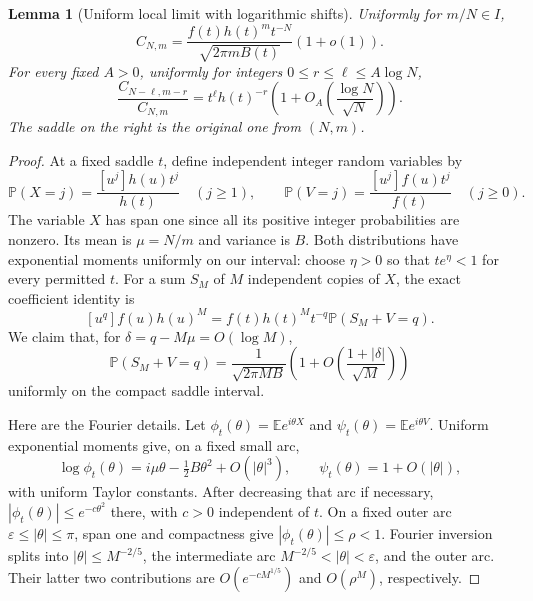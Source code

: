 \documentclass[11pt,letterpaper]{article}
\newtheorem{lemma}[theorem]{Lemma}
\theoremstyle{remark}\newtheorem{remark}[theorem]{Remark}
\newcommand{\Prob}{\mathbb P}
\newcommand{\E}{\mathbb E}
\begin{document}
\begin{lemma}[Uniform local limit with logarithmic shifts]\label{wdn:dia:lem:LLT}
Uniformly for $m/N\in I$,
\begin{equation}\label{wdn:dia:eq:saddle}
 C_{N,m}=\frac{f(t)h(t)^mt^{-N}}{\sqrt{2\pi mB(t)}}(1+o(1)).
\end{equation}
For every fixed $A>0$, uniformly for integers $0\le r\le\ell\le A\log N$,
\begin{equation}\label{wdn:dia:eq:shift}
 \frac{C_{N-\ell,m-r}}{C_{N,m}}
 =t^\ell h(t)^{-r}\left(1+O_A\left(\frac{\log N}{\sqrt N}\right)\right).
\end{equation}
The saddle on the right is the original one from $(N,m)$.
\end{lemma}
\begin{proof}
At a fixed saddle $t$, define independent integer random variables by
\[
 \Prob(X=j)=\frac{[u^j]h(u)t^j}{h(t)}\quad(j\ge1),\qquad
 \Prob(V=j)=\frac{[u^j]f(u)t^j}{f(t)}\quad(j\ge0).
\]
The variable $X$ has span one since all its positive integer probabilities
are nonzero. Its mean is $\mu=N/m$ and variance is $B$. Both distributions
have exponential moments uniformly on our interval: choose $\eta>0$ so that
$t e^\eta<1$ for every permitted $t$. For a sum $S_M$ of $M$ independent
copies of $X$, the exact coefficient identity is
\begin{equation}\label{wdn:dia:eq:probcoef}
 [u^q]f(u)h(u)^M=f(t)h(t)^Mt^{-q}\Prob(S_M+V=q).
\end{equation}
We claim that, for $\delta=q-M\mu=O(\log M)$,
\begin{equation}\label{wdn:dia:eq:localprob}
 \Prob(S_M+V=q)=\frac1{\sqrt{2\pi MB}}
 \left(1+O\left(\frac{1+|\delta|}{\sqrt M}\right)\right)
\end{equation}
uniformly on the compact saddle interval.

Here are the Fourier details. Let $\phi_t(\theta)=\E e^{i\theta X}$ and
$\psi_t(\theta)=\E e^{i\theta V}$. Uniform exponential moments give, on a
fixed small arc,
\[
 \log\phi_t(\theta)=i\mu\theta-\tfrac12B\theta^2+O(|\theta|^3),
 \qquad \psi_t(\theta)=1+O(|\theta|),
\]
with uniform Taylor constants. After decreasing that arc if necessary,
$|\phi_t(\theta)|\le e^{-c\theta^2}$ there, with $c>0$ independent of $t$.
On a fixed outer arc $\varepsilon\le|\theta|\le\pi$, span one and compactness
give $|\phi_t(\theta)|\le\rho<1$. Fourier inversion splits into
$|\theta|\le M^{-2/5}$, the intermediate arc
$M^{-2/5}<|\theta|<\varepsilon$, and the outer arc. Their latter two
contributions are $O(e^{-cM^{1/5}})$ and $O(\rho^M)$, respectively.


\end{proof}
\end{document}
